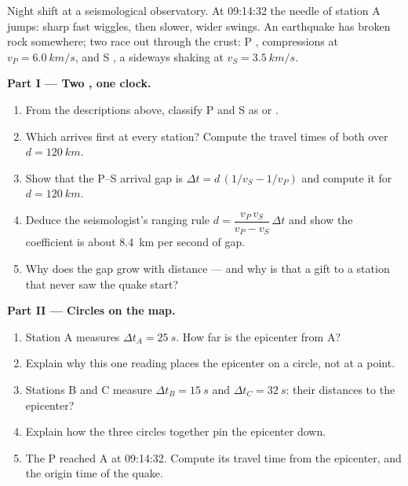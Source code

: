 \begin{problem}
\label{pb:g12:mechanical-waves:1}
Night shift at a seismological observatory. At 09:14:32 the needle of
station A jumps: sharp fast wiggles, then slower, wider swings. An
earthquake has broken rock somewhere; two  race out through the
crust: P , compressions at $v_P = \qty{6.0}{km/s}$, and S ,
a sideways shaking at $v_S = \qty{3.5}{km/s}$.

\medskip
\noindent\textbf{Part I --- Two , one clock.}
\begin{enumerate}
  \item From the descriptions above, classify P and S  as
         or .
  \item Which  arrives first at every station? Compute the travel
        times of both over $d = \qty{120}{km}$.
  \item Show that the P--S arrival gap is
        $\Delta t = d\,(1/v_S - 1/v_P)$ and compute it for
        $d = \qty{120}{km}$.
  \item Deduce the seismologist's ranging rule
        $d = \dfrac{v_P\,v_S}{v_P - v_S}\,\Delta t$ and show the
        coefficient is about \qty{8.4}{km} per second of gap.
  \item Why does the gap grow with distance --- and why is that a gift
        to a station that never saw the quake start?
\end{enumerate}

\medskip
\noindent\textbf{Part II --- Circles on the map.}
\begin{enumerate}[resume]
  \item Station A measures $\Delta t_A = \qty{25}{s}$. How far is the
        epicenter from A?
  \item Explain why this one reading places the epicenter on a circle,
        not at a point.
  \item Stations B and C measure $\Delta t_B = \qty{15}{s}$ and
        $\Delta t_C = \qty{32}{s}$: their distances to the epicenter?
  \item Explain how the three circles together pin the epicenter down.
  \item The P  reached A at 09:14:32. Compute its travel time from
        the epicenter, and the origin time of the quake.
\end{enumerate}


\end{problem}
